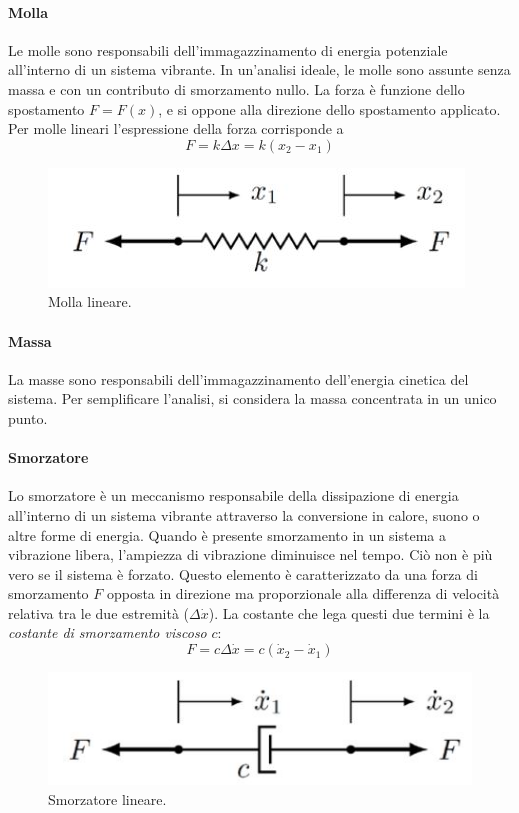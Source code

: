 \paragraph{Molla} Le molle sono responsabili dell'immagazzinamento di energia potenziale all'interno di un sistema vibrante. In un'analisi ideale, le molle sono assunte senza massa e con un contributo di smorzamento nullo. 
La forza è funzione dello spostamento $F=F(x)$, e si oppone alla direzione dello spostamento applicato. Per molle lineari l'espressione della forza corrisponde a 
\begin{equation}
    F=k \Delta x= k (x_2-x_1)
\end{equation}
\begin{figure}[h]
    \centering
    \includegraphics[scale=0.6]{Immagini/MollaLineare.JPG}
    \caption{Molla lineare.}
    \label{MollaLineare}
\end{figure}
\paragraph{Massa} La masse sono responsabili dell'immagazzinamento dell'energia cinetica del sistema. Per semplificare l'analisi, si considera la massa concentrata in un unico punto.
\paragraph{Smorzatore} Lo smorzatore è un meccanismo responsabile della dissipazione di energia all'interno di un sistema vibrante attraverso la conversione in calore, suono o altre forme di energia. Quando è presente smorzamento in un sistema a vibrazione libera, l'ampiezza di vibrazione diminuisce nel tempo. Ciò non è più vero se il sistema è forzato. 
Questo elemento è caratterizzato da una forza di smorzamento $F$ opposta in direzione ma proporzionale alla differenza di velocità relativa tra le due estremità ($\Delta \dot x$). La costante che lega questi due termini è la \textit{costante di smorzamento viscoso} $c$:
\begin{equation}
    F=c \Delta \dot x= c(\dot x_2-\dot x_1)
\end{equation}
\begin{figure}[h]
    \centering
    \includegraphics[scale=0.6]{Immagini/SmorzatoreLineare.JPG}
    \caption{Smorzatore lineare.}
    \label{SmorzatoreLineare}
\end{figure}




